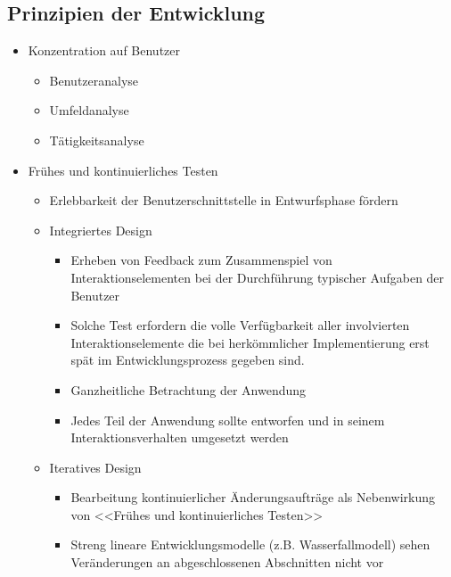 \documentclass[8pt,a4paper,landscape]{extarticle}
\begin{document}
\begin{multicols*}{4}
	\subsection{Prinzipien der Entwicklung}
	\begin{itemize}
		\item Konzentration auf Benutzer
		      \begin{itemize}[nolistsep]
			      \item Benutzeranalyse
			      \item Umfeldanalyse
			      \item Tätigkeitsanalyse
		      \end{itemize}
		\item Frühes und kontinuierliches Testen
		      \begin{itemize}[nolistsep]
			      \item Erlebbarkeit der Benutzerschnittstelle in Entwurfsphase
			            fördern
			      \item Integriertes Design
			            \begin{itemize}[nolistsep]
				            \item Erheben von Feedback zum Zusammenspiel von
				                  Interaktionselementen bei der Durchführung
				                  typischer Aufgaben der Benutzer
				            \item Solche Test erfordern die volle Verfügbarkeit
				                  aller involvierten Interaktionselemente die
				                  bei herkömmlicher Implementierung erst spät im
				                  Entwicklungsprozess gegeben sind.
				            \item  Ganzheitliche Betrachtung der Anwendung
				            \item  Jedes Teil der Anwendung sollte entworfen und
				                  in seinem Interaktionsverhalten umgesetzt
				                  werden
			            \end{itemize}
			      \item Iteratives Design
			            \begin{itemize}[nolistsep]
				            \item Bearbeitung kontinuierlicher Änderungsaufträge
				                  als Nebenwirkung von
				                  <<Frühes und kontinuierliches Testen>>
				            \item  Streng lineare Entwicklungsmodelle
				                  (z.B. Wasserfallmodell) sehen Veränderungen an
				                  abgeschlossenen Abschnitten nicht vor

\end{itemize}
\end{itemize}
\end{itemize}
\end{multicols*}
\end{document}
